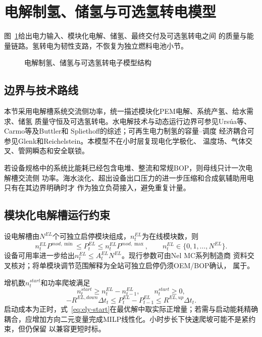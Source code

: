 \section{电解制氢、储氢与可选氢转电模型}
\label{sec:hydrogen}

图~\ref{fig:hydrogen-model}给出电力输入、模块化电解、储氢、最终交付及可选氢转电之间
的质量与能量链路。氢转电为韧性支路，不恢复为独立燃料电池小节。
\begin{figure}[H]
\centering
\resizebox{0.92\textwidth}{!}{}
\caption{电解制氢、储氢与可选氢转电子模型结构}
\label{fig:hydrogen-model}
\end{figure}

\subsection{边界与技术路线}

本节采用电解槽系统交流侧功率，统一描述模块化PEM电解、系统产氢、给水需求、储氢
质量守恒及可选氢转电。水电解技术与动态运行边界可参见Ursúa等、Carmo等及Buttler和
Spliethoff的综述\cite{ursua2012,carmo2013,buttler2018}；可再生电力制氢的容量--调度
经济耦合可参见Glenk和Reichelstein\cite{glenk2019}。本模型不在小时层复现电化学极化、
温度场、气体交叉、管网瞬态和安全联锁。

若设备规格中的系统比能耗已经包含电堆、整流和常规BOP，则母线只计一次电解槽交流侧
功率。海水淡化、超出设备出口压力的进一步压缩和合成氨辅助用电只有在其边界明确时才
作为独立负荷接入，避免重复计量。

\subsection{模块化电解槽运行约束}

设电解槽由$N^{EL}$个可独立启停模块组成，$n_t^{EL}$为在线模块数，则
\begin{equation}
n_t^{EL}P^{mod,\min}\le P_t^{EL}
\le n_t^{EL}P^{mod,\max},\qquad
n_t^{EL}\in\{0,1,\ldots,N^{EL}\}.
\label{eq:ely-module}
\end{equation}
设备可用率进一步给出$n_t^{EL}\le A_t^{EL}N^{EL}$。现行参数可由Nel MC系列制造商
资料交叉核对\cite{nel-mc}；将单模块调节范围解释为全站可独立启停仍须OEM/BOP确认，
属于\assumptiontag。

增机数$n_t^{start}$和功率爬坡满足
\begin{equation}
n_t^{start}\ge n_t^{EL}-n_{t-1}^{EL},\qquad n_t^{start}\ge0,
\label{eq:ely-start}
\end{equation}
\begin{equation}
-R^{EL,down}\Delta t_t\le P_t^{EL}-P_{t-1}^{EL}
\le R^{EL,up}\Delta t_t.
\label{eq:ely-ramp}
\end{equation}
启动成本为正时，式~\eqref{eq:ely-start}在最优解中取实际正增量；若需与启动能耗精确
耦合，应增加方向二元变量完成MILP线性化。小时步长下快速爬坡可能不是紧约束，但仍保留
以兼容更短时标。

